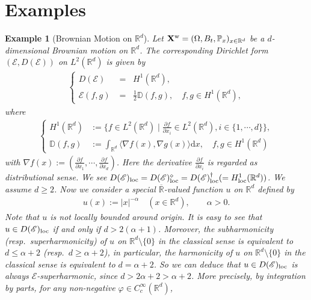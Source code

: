 \documentclass[12pt,a4paper]{article}
\newtheorem{example}[thm]{Example}
\renewcommand{\P}{\mathbb{P}}
\newcommand{\R}{\mathbb{R}}
\renewcommand{\d}{\mathrm{d}}
\newcommand{\loc}{{\rm loc}}
\newcommand{\1}{{\bf 1}}
\begin{document}
\section{Examples}\label{sec:Example}
\begin{example}[Brownian Motion on $\R^d$]\label{ex:BM}
\rm Let
${\bf X}^{\rm w}=(\Omega, B_t, {\P}_x)_{x\in\R^d}$ be
a $d$-dimensional Brownian motion on $\R^d$.  
The corresponding Dirichlet form $(\mathscr{E},D(\mathscr{E}))$ on $L^2(\R^d)$ is given by 
\begin{align*}
\left\{\begin{array}{rl} D(\mathscr{E})\!\!&=\;\;H^1(\R^d), \\
\mathscr{E}(f,g)\!\!&=\;\;\frac12\mathbb{D}(f,g),\quad f,g\in H^1(\R^d),\end{array}\right.
\end{align*}
where 
\begin{align*}
\left\{\begin{array}{rl}
H^1(\R^d)&:=\{f\in L^2(\R^d)\mid \frac{\partial f}{\partial x_i}\in L^2(\R^d), i\in\{1,\cdots,d\}\}, \\
\mathbb{D}(f,g)&:=
\int_{\R^d}\langle \nabla f(x),\nabla g(x)\rangle{\d} x,\quad f,g\in H^1(\R^d)
\end{array}\right.
\end{align*}
with 
$\nabla f(x):=(\frac{\partial f}{\partial x_1},\cdots, \frac{\partial f}{\partial x_d})$.  
Here the derivative $\frac{\partial f}{\partial x_i}$ is regarded as   distributional sense. We see $D(\mathscr{E})_{\loc}=D(\mathscr{E})_{\loc}^{\diamond}=D(\mathscr{E})_{\loc}^{\dag}(=H^1_{\loc}(\R^d))$. We assume $d\geq2$. 
Now we consider a special 
$\overline{\R}$-valued function 
$u$ on $\R^d$ defined by 
\begin{align*}
u(x):=|x|^{-\alpha} \quad (x\in\R^d),\qquad \alpha>0.
\end{align*}
Note that $u$ is not locally bounded around origin. 
It is easy to see that $u\in D(\mathscr{E})_{\loc}$ if and only if 
 $d>2(\alpha+1)$. Moreover, the subharmonicity 
 (resp.~superharmonicity) of 
 $u$ on $\R^d\setminus\{0\}$ in the classical sense is equivalent to $d\leq \alpha+2$ (resp.~$d\geq\alpha+2$), in 
 particular, the harmonicity of $u$ on $\R^d\setminus\{0\}$ in the classical sense is equivalent to $d=\alpha+2$. So we can deduce that 
 $u\in D(\mathscr{E})_{\loc}$ is always $\mathscr{E}$-superharmonic, since $d>2\alpha+2>\alpha+2$.
 More precisely, by integration by parts, for any non-negative 
 $\varphi\in C_c^{\infty}(\R^d)$, 
 \begin{align*}

\end{align*}
\end{example}
\end{document}
